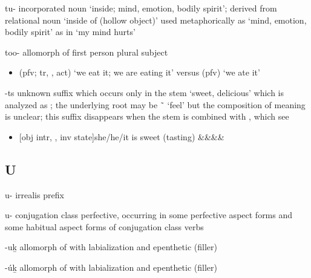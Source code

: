 \begin{morphdesc}[resume*=alphalist]
\item[tu-]
	incorporated noun ‘inside; mind, emotion, bodily spirit’;
	derived from relational noun  ‘inside of (hollow object)’
	used metaphorically as ‘mind, emotion, bodily spirit’ as in  ‘my mind hurts’

\item[too-]
	allomorph of first person plural subject 
	\begin{itemize}
	\item	{} (pfv; tr, ,  act) ‘we eat it; we are eating it’\newline
		versus  (pfv) ‘we ate it’
	\end{itemize}

\item[-ts]\label{m:-ts}
	unknown suffix which occurs only in the stem  ‘sweet, delicious’
		which is analyzed as ;
	the underlying root may be  \~\  ‘feel’
		but the composition of meaning is unclear;
	this suffix disappears when the stem  is combined with ,
		which see
	\begin{itemize}
	\item	{}[obj intr, , inv state]{she/he/it is sweet (tasting)}
				{&&&\·&\·}
	\end{itemize}
\end{morphdesc}

\subsection{U}\label{sec:alphalist-u}
\begin{morphdesc}[resume*=alphalist]
\item[u-]\label{m:u-irr}
	irrealis prefix

\item[u-]\label{m:u-pfv}
	 conjugation class perfective,
	occurring in some perfective aspect forms and some habitual aspect forms of
	 conjugation class verbs

\item[-uḵ]\label{m:-uḵ}
	allomorph of  with labialization and epenthetic (filler) 

\item[-úḵ]\label{m:-úḵ}
	allomorph of  with labialization and epenthetic (filler) 

\end{morphdesc}

